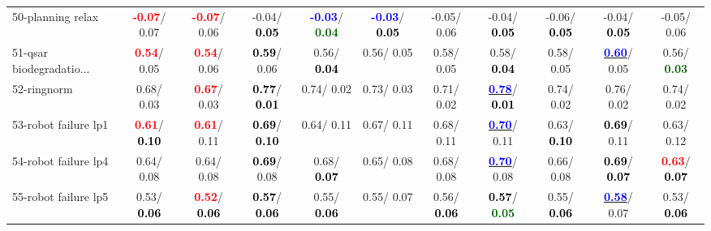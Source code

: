\begin{table}[h]
\begin{center}
{\begin{tabular}{lc|c|c|c|c|c|c|c|c|c}
50-planning relax & \textcolor{red}{\textbf{ -0.07}}/  0.07 & \textcolor{red}{\textbf{ -0.07}}/  0.06 &  -0.04/\textcolor{black}{\textbf{  0.05}} & \textcolor{blue}{\textbf{ -0.03}}/\textcolor{darkgreen}{\textbf{  0.04}} & \textcolor{blue}{\textbf{ -0.03}}/\textcolor{black}{\textbf{  0.05}} &  -0.05/  0.06 &  -0.04/\textcolor{black}{\textbf{  0.05}} &  -0.06/\textcolor{black}{\textbf{  0.05}} &  -0.04/\textcolor{black}{\textbf{  0.05}} &  -0.05/  0.06 \\
51-qsar biodegradatio... & \textcolor{red}{\textbf{  0.54}}/  0.05 & \textcolor{red}{\textbf{  0.54}}/  0.06 & \textcolor{black}{\textbf{  0.59}}/  0.06 &   0.56/\textcolor{black}{\textbf{  0.04}} &   0.56/  0.05 &   0.58/  0.05 &   0.58/\textcolor{black}{\textbf{  0.04}} &   0.58/  0.05 & \underline{\textcolor{blue}{\textbf{  0.60}}}/  0.05 &   0.56/\textcolor{darkgreen}{\textbf{  0.03}} \\
52-ringnorm &   0.68/  0.03 & \textcolor{red}{\textbf{  0.67}}/  0.03 & \textcolor{black}{\textbf{  0.77}}/\textcolor{black}{\textbf{  0.01}} &   0.74/  0.02 &   0.73/  0.03 &   0.71/  0.02 & \underline{\textcolor{blue}{\textbf{  0.78}}}/\textcolor{black}{\textbf{  0.01}} &   0.74/  0.02 &   0.76/  0.02 &   0.74/  0.02 \\
53-robot failure lp1 & \textcolor{red}{\textbf{  0.61}}/\textcolor{black}{\textbf{  0.10}} & \textcolor{red}{\textbf{  0.61}}/  0.11 & \textcolor{black}{\textbf{  0.69}}/\textcolor{black}{\textbf{  0.10}} &   0.64/  0.11 &   0.67/  0.11 &   0.68/  0.11 & \underline{\textcolor{blue}{\textbf{  0.70}}}/  0.11 &   0.63/\textcolor{black}{\textbf{  0.10}} & \textcolor{black}{\textbf{  0.69}}/  0.11 &   0.63/  0.12 \\ \hline
54-robot failure lp4 &   0.64/  0.08 &   0.64/  0.08 & \textcolor{black}{\textbf{  0.69}}/  0.08 &   0.68/\textcolor{black}{\textbf{  0.07}} &   0.65/  0.08 &   0.68/  0.08 & \underline{\textcolor{blue}{\textbf{  0.70}}}/  0.08 &   0.66/  0.08 & \textcolor{black}{\textbf{  0.69}}/\textcolor{black}{\textbf{  0.07}} & \textcolor{red}{\textbf{  0.63}}/\textcolor{black}{\textbf{  0.07}} \\
55-robot failure lp5 &   0.53/\textcolor{black}{\textbf{  0.06}} & \textcolor{red}{\textbf{  0.52}}/\textcolor{black}{\textbf{  0.06}} & \textcolor{black}{\textbf{  0.57}}/\textcolor{black}{\textbf{  0.06}} &   0.55/\textcolor{black}{\textbf{  0.06}} &   0.55/  0.07 &   0.56/\textcolor{black}{\textbf{  0.06}} & \textcolor{black}{\textbf{  0.57}}/\textcolor{darkgreen}{\textbf{  0.05}} &   0.55/\textcolor{black}{\textbf{  0.06}} & \underline{\textcolor{blue}{\textbf{  0.58}}}/  0.07 &   0.53/\textcolor{black}{\textbf{  0.06}} \\

\end{tabular}}
\end{center}
\end{table}
